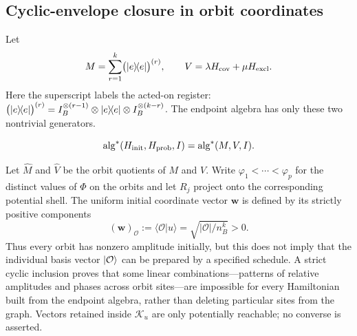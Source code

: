 \subsection{Cyclic-envelope closure in orbit coordinates}

Let
\begin{equation}
 M=\sum_{r=1}^k\bigl(\lvert e\rangle\!\langle e\rvert\bigr)^{(r)},
 \qquad V=\lambda H_{\rm cov}+\mu H_{\rm excl}.
 \label{eq:transport-potential-generators}
\end{equation}
Here the superscript labels the acted-on register:
$\bigl(\lvert e\rangle\!\langle e\rvert\bigr)^{(r)}=
I_B^{\otimes(r-1)}\otimes\lvert e\rangle\!\langle e\rvert\otimes
I_B^{\otimes(k-r)}$.
The endpoint algebra has only these two nontrivial generators.

\begin{lemma}
\label{lem:two-generator-reduction}
\begin{equation}
 \operatorname{alg}^*(H_{\rm init},H_{\rm prob},I)
 =\operatorname{alg}^*(M,V,I).
 \label{eq:two-generator-reduction}
\end{equation}
\end{lemma}

Let $\widehat M$ and $\widehat V$ be the orbit quotients of $M$ and $V$.
Write $\varphi_1<\cdots<\varphi_p$ for the distinct values of $\Phi$ on
the orbits and let $R_j$ project onto the corresponding potential shell.
The uniform initial coordinate vector $\boldsymbol w$ is defined by its
strictly positive components
\begin{equation}
 (\boldsymbol w)_{\mathcal O}:=\langle\mathcal O|u\rangle
 =\sqrt{|\mathcal O|/n_B^k}>0.
 \label{eq:uniform-orbit-coordinates}
\end{equation}
Thus every orbit has nonzero amplitude initially, but this does not imply
that the individual basis vector $\lvert\mathcal O\rangle$ can be prepared by a
specified schedule.  A strict cyclic inclusion proves that some linear
combinations---patterns of relative amplitudes and phases across orbit
sites---are impossible for every Hamiltonian built from the endpoint
algebra, rather than deleting particular sites from the graph.  Vectors
retained inside $\mathcal K_u$ are only potentially reachable; no converse
is asserted.

